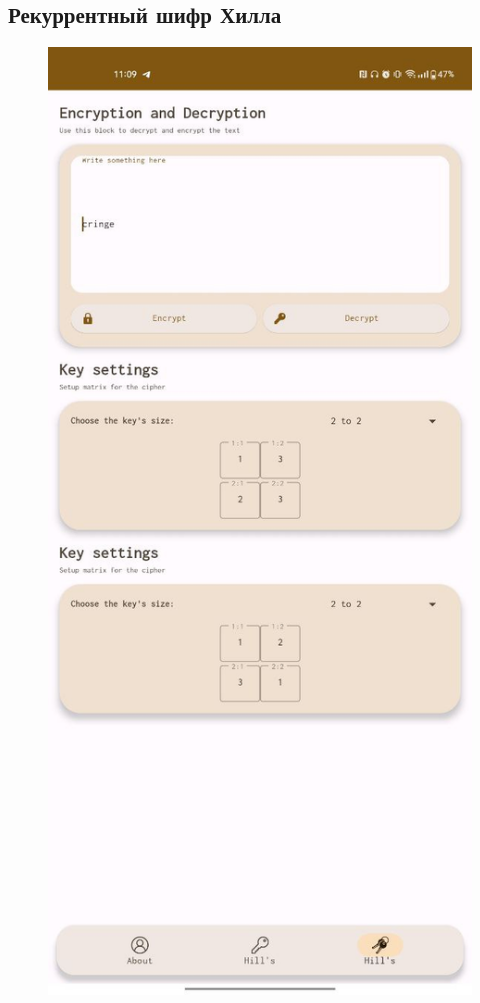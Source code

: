 \documentclass[a4paper]{article}
\begin{document}
  \subsection{Рекуррентный шифр Хилла}

  \begin{figure}[H]
    \begin{minipage}{0.3\textwidth}
        \centering
        \includegraphics[width=\textwidth]{02_0004}

\end{minipage}
\end{figure}
\end{document}
